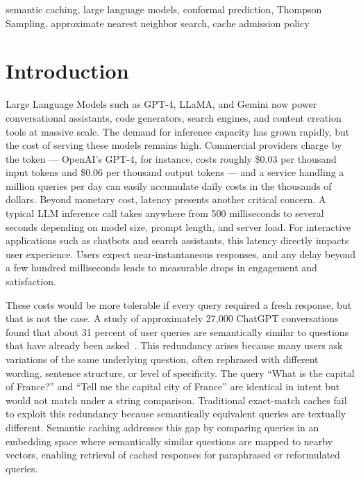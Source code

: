 \documentclass[conference]{IEEEtran}
\begin{document}
\begin{IEEEkeywords}
semantic caching, large language models, conformal prediction, Thompson Sampling, approximate nearest neighbor search, cache admission policy
\end{IEEEkeywords}

\section{Introduction}

Large Language Models such as GPT-4, LLaMA, and Gemini now power conversational assistants, code generators, search engines, and content creation tools at massive scale. The demand for inference capacity has grown rapidly, but the cost of serving these models remains high. Commercial providers charge by the token --- OpenAI's GPT-4, for instance, costs roughly \$0.03 per thousand input tokens and \$0.06 per thousand output tokens --- and a service handling a million queries per day can easily accumulate daily costs in the thousands of dollars. Beyond monetary cost, latency presents another critical concern. A typical LLM inference call takes anywhere from 500 milliseconds to several seconds depending on model size, prompt length, and server load. For interactive applications such as chatbots and search assistants, this latency directly impacts user experience. Users expect near-instantaneous responses, and any delay beyond a few hundred milliseconds leads to measurable drops in engagement and satisfaction.

These costs would be more tolerable if every query required a fresh response, but that is not the case. A study of approximately 27,000 ChatGPT conversations found that about 31 percent of user queries are semantically similar to questions that have already been asked~\cite{zhu2023}. This redundancy arises because many users ask variations of the same underlying question, often rephrased with different wording, sentence structure, or level of specificity. The query ``What is the capital of France?'' and ``Tell me the capital city of France'' are identical in intent but would not match under a string comparison. Traditional exact-match caches fail to exploit this redundancy because semantically equivalent queries are textually different. Semantic caching addresses this gap by comparing queries in an embedding space where semantically similar questions are mapped to nearby vectors, enabling retrieval of cached responses for paraphrased or reformulated queries.
\end{document}
